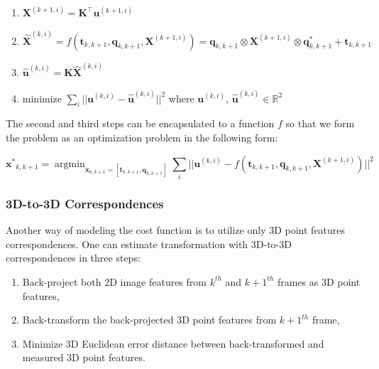 \documentclass[12pt]{report}
\numberwithin{figure}{section}
\newcommand{\argmin}{\mathop{\mathrm{argmin}}}
\newcommand{\R}{\mathbb{R}}
\begin{document}
\begin{enumerate}
  \item $\mathbf{X}^{(k+1,i)} = \mathbf{K}^\top \mathbf{u}^{(k+1,i)}$
  \item $\mathbf{\hat{X}}^{(k,i)} = f(\mathbf{t}_{k,k+1}, \mathbf{q}_{k,k+1}, 
  \mathbf{X}^{(k+1,i)}) = 
    \mathbf{q}_{k,k+1} \otimes \mathbf{X}^{(k+1,i)} \otimes 
    \mathbf{q}_{k,k+1}^* + \mathbf{t}_{k,k+1} $
  \item $\mathbf{\hat{u}}^{(k,i)} = \mathbf{K}\mathbf{\hat{X}}^{(k,i)}$
  \item minimize $\sum_i||\mathbf{u}^{(k,i)} - \mathbf{\hat{u}}^{(k,i)}||^2$ 
  where 
    $\mathbf{u}^{(k,i)}$, $\mathbf{\hat{u}}^{(k,i)} \in \R^2$
\end{enumerate}

The second and third steps can be encapsulated to a function $f$ so that 
we form the problem as an optimization problem in the following form:

\begin{equation}
  \mathbf{x^*}_{k,k+1} = \argmin_{\mathbf{x}_{k,k+1} = [\mathbf{t}_{k,k+1}, 
  \mathbf{q}_{k,k+1}]}
  \sum_i||\mathbf{u}^{(k,i)} - f(\mathbf{t}_{k,k+1}, \mathbf{q}_{k,k+1}, 
  \mathbf{X}^{(k+1,i)})||^2
\end{equation}


\subsubsection{3D-to-3D Correspondences}\label{sb_sc_3d_to_3d}

Another way of modeling the cost function is to utilize only 3D point features 
correspondences. One can estimate transformation with 3D-to-3D 
correspondences in three steps:

\begin{enumerate}
  \item Back-project both 2D image features from $k^{th}$ and $k+1^{th}$ 
  frames as 3D point features, 
  \item Back-transform the back-projected 3D point features from $k+1^{th}$ 
  frame,
  \item Minimize 3D Euclidean error distance between back-transformed and 
  measured 3D point features.
\end{enumerate}
\end{document}
